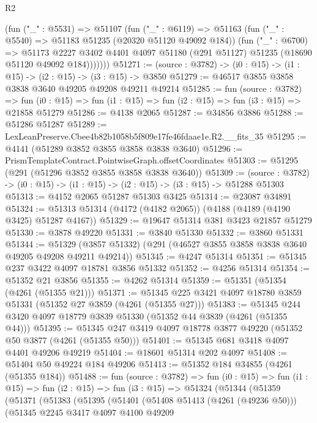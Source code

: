 \begin{lexlean}{R2}
\begin{coremodule}
          (fun ("_" : @5531) =>
          @51107
            (fun ("_" : @6119) =>
            @51163
              (fun ("_" : @5540) => @51183 @51235 (@20320 @51120 @49092 @184))
              (fun ("_" : @6700) =>
              @51173
                @2227
                @3402
                @4401
                @4097
                @51180
                (@291 @51127)
                @51235
                (@18690 @51120 @49092 @184)))))))
@51271 := (source : @3782) -> (i0 : @15) -> (i1 : @15) -> (i2 : @15) -> (i3 : @15) -> @3850
@51279 := @46517 @3855 @3858 @3838 @3640 @49205 @49208 @49211 @49214
@51285 := fun (source : @3782) =>
  fun (i0 : @15) => fun (i1 : @15) => fun (i2 : @15) => fun (i3 : @15) => @21858 @51279
@51286 := @4138 @2065
@51287 := @34856 @3886
@51288 := @51286 @51287
@51289 := LexLeanPreserve.Cbee4b82b1058b5f809e17fe46fdaae1e.R2.__fits_35
@51295 := @4141 (@51289 @3852 @3855 @3858 @3838 @3640)
@51296 := PrismTemplateContract.PointwiseGraph.offsetCoordinates
@51303 := @51295 (@291 (@51296 @3852 @3855 @3858 @3838 @3640))
@51309 := (source : @3782) -> (i0 : @15) -> (i1 : @15) -> (i2 : @15) -> (i3 : @15) -> @51288 @51303
@51313 := @4152 @2065 @51287 @51303 @3425
@51314 := @23087 @34891
@51324 := @51313 @51314 (@4172 (@4182 @2065)) (@4188 (@4189 (@4190 @3425) @51287 @4167))
@51329 := @19647 @51314 @381 @3423 @21857 @51279
@51330 := @3878 @49220
@51331 := @3840 @51330
@51332 := @3860 @51331
@51344 := @51329 (@3857 @51332) (@291 (@46527 @3855 @3858 @3838 @3640 @49205 @49208 @49211 @49214))
@51345 := @4247 @51314
@51351 := @51345 @237 @3422 @4097 @18781 @3856 @51332
@51352 := @4256 @51314
@51354 := @51352 @21 @3856
@51355 := @4262 @51314
@51359 := @51351 (@51354 (@4261 (@51355 @21)))
@51371 := @51345 @225 @3421 @4097 @18780 @3859 @51331 (@51352 @27 @3859 (@4261 (@51355 @27)))
@51383 := @51345 @244 @3420 @4097 @18779 @3839 @51330 (@51352 @44 @3839 (@4261 (@51355 @44)))
@51395 := @51345 @247 @3419 @4097 @18778 @3877 @49220 (@51352 @50 @3877 (@4261 (@51355 @50)))
@51401 := @51345 @681 @3418 @4097 @4401 @49206 @49219
@51404 := @18601 @51314 @202 @4097
@51408 := @51404 @50 @49224 @184 @49206
@51413 := @51352 @184 @34855 (@4261 (@51355 @184))
@51488 := fun (source : @3782) =>
  fun (i0 : @15) =>
  fun (i1 : @15) =>
  fun (i2 : @15) =>
  fun (i3 : @15) =>
  @51324
    (@51344
      (@51359
        (@51371
          (@51383
            (@51395
              (@51401
                (@51408 @51413 (@4261 (@49236 @50)))
                (@51345
                  @2245
                  @3417
                  @4097
                  @4100
                  @49209

\end{coremodule}
\end{lexlean}
